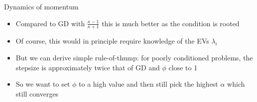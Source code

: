 \documentclass[11pt,compress,t,notes=noshow, xcolor=table]{beamer}
\begin{document}
\begin{vbframe}{Dynamics of momentum}
\begin{itemize}

\item Compared to GD with $\frac{\kappa-1}{\kappa+1}$ this is much better as the condition is rooted

\item Of course, this would in principle require knowledge of the EVs $\lambda_i$
\item But we can derive simple rule-of-thump: for poorly conditioned problems, the stepsize is approximately twice that of GD and $\phi$ close to 1
\item So we want to set $\phi$ to a high value and then still pick the highest $\alpha$ which still converges
\end{itemize}
\end{vbframe}



		 
		
		




\endlecture
\end{document}
